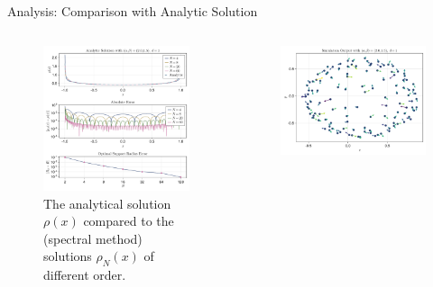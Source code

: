 \documentclass[aspectratio=169, hyperref={colorlinks=true}]{beamer}
\begin{document}
  \begin{frame}{Analysis: Comparison with Analytic Solution}
    \begin{columns}
      \begin{column}{0.6\textwidth}
        \begin{figure}[H]
          \centering
          \includegraphics[width=\linewidth, trim={0 6.3cm 0 0}, clip]{results/known-analytic/analytic-solution.pdf}
          \caption[Comparison with analytical solutions and error]{
            The analytical solution $\rho(x)$ compared to the (spectral method) solutions $\rho_N(x)$ of different order.
          }
          \label{fig:analytic-solution}
        \end{figure}
      \end{column}
      \begin{column}{0.4\textwidth}
        \begin{figure}[H]
          \centering
          \includegraphics[width=\linewidth]{results/known-analytic/simulation-quiver.pdf}

\end{figure}
\end{column}
\end{columns}
\end{frame}
\end{document}
